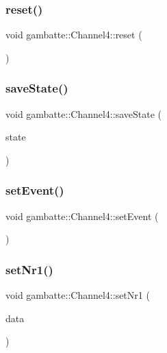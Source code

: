 \subsubsection{\texorpdfstring{reset()}{reset()}}
{\footnotesize\ttfamily void gambatte\+::\+Channel4\+::reset (\begin{DoxyParamCaption}{ }\end{DoxyParamCaption})}

\mbox{\label{classgambatte_1_1Channel4_a59e6a5fccc0b14b93cf0eceb3ba4087c}} 
\subsubsection{\texorpdfstring{save\+State()}{saveState()}}
{\footnotesize\ttfamily void gambatte\+::\+Channel4\+::save\+State (\begin{DoxyParamCaption}\item[{\hyperlink{structgambatte_1_1SaveState}{Save\+State} \&}]{state }\end{DoxyParamCaption})}

\mbox{\label{classgambatte_1_1Channel4_ac2368165993248064ae125cfe2ca91e1}} 
\subsubsection{\texorpdfstring{set\+Event()}{setEvent()}}
{\footnotesize\ttfamily void gambatte\+::\+Channel4\+::set\+Event (\begin{DoxyParamCaption}{ }\end{DoxyParamCaption})\hspace{0.3cm}{\ttfamily [private]}}

\mbox{\label{classgambatte_1_1Channel4_a29c6023cb669f67015be405d9fd11e84}} 
\subsubsection{\texorpdfstring{set\+Nr1()}{setNr1()}}
{\footnotesize\ttfamily void gambatte\+::\+Channel4\+::set\+Nr1 (\begin{DoxyParamCaption}\item[{unsigned}]{data }\end{DoxyParamCaption})}

